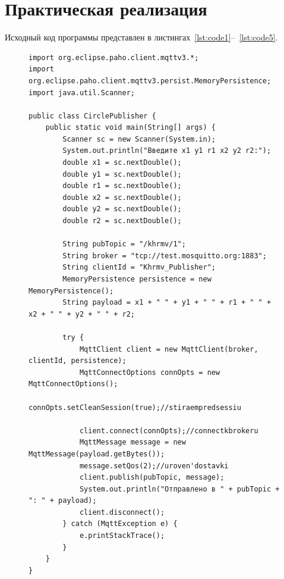 \documentclass[a4paper, 14pt]{extarticle}
\begin{document}
\section {Практическая реализация}
Исходный код программы представлен в листингах~\ref{lst:code1}--~\ref{lst:code5}.
\begin{figure}[!htb]
\begin{lstlisting}[language={},caption={Консольная реализация},label={lst:code1}]
import org.eclipse.paho.client.mqttv3.*;
import org.eclipse.paho.client.mqttv3.persist.MemoryPersistence;
import java.util.Scanner;

public class CirclePublisher {
    public static void main(String[] args) {
        Scanner sc = new Scanner(System.in);
        System.out.println("Введите x1 y1 r1 x2 y2 r2:");
        double x1 = sc.nextDouble();
        double y1 = sc.nextDouble();
        double r1 = sc.nextDouble();
        double x2 = sc.nextDouble();
        double y2 = sc.nextDouble();
        double r2 = sc.nextDouble();

        String pubTopic = "/khrmv/1";
        String broker = "tcp://test.mosquitto.org:1883";
        String clientId = "Khrmv_Publisher";
        MemoryPersistence persistence = new MemoryPersistence();
        String payload = x1 + " " + y1 + " " + r1 + " " + x2 + " " + y2 + " " + r2;

        try {
            MqttClient client = new MqttClient(broker, clientId, persistence);
            MqttConnectOptions connOpts = new MqttConnectOptions();
            connOpts.setCleanSession(true);//stiraempredsessiu

            client.connect(connOpts);//connectkbrokeru
            MqttMessage message = new MqttMessage(payload.getBytes());
            message.setQos(2);//uroven'dostavki
            client.publish(pubTopic, message);
            System.out.println("Отправлено в " + pubTopic + ": " + payload);
            client.disconnect();
        } catch (MqttException e) {
            e.printStackTrace();
        }
    }
}


\end{lstlisting}
\end{figure}
\newpage
\end{document}
